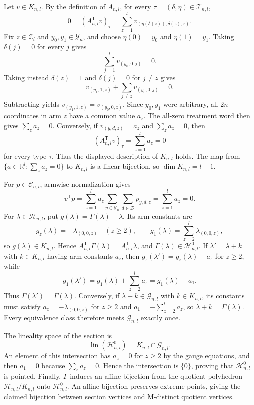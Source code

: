 Let \(v\in K_{n,l}\). By the definition of \(A_{n,l}\), for every \(\tau=(\delta,\eta)\in\mathcal T_{n,l}\),
\[
0=(A_{n,l}^{\mathsf T}v)_\tau=\sum_{z=1}^l v_{(\eta(\delta(z)),\delta(z),z)}.
\]
Fix \(z\in\mathcal Z_l\) and \(y_0,y_1\in\mathcal Y_n\), and choose \(\eta(0)=y_0\) and \(\eta(1)=y_1\). Taking \(\delta(j)=0\) for every \(j\) gives
\[
\sum_{j=1}^l v_{(y_0,0,j)}=0.
\]
Taking instead \(\delta(z)=1\) and \(\delta(j)=0\) for \(j\ne z\) gives
\[
v_{(y_1,1,z)}+\sum_{j\ne z}v_{(y_0,0,j)}=0.
\]
Subtracting yields \(v_{(y_1,1,z)}=v_{(y_0,0,z)}\). Since \(y_0,y_1\) were arbitrary, all \(2n\) coordinates in arm \(z\) have a common value \(a_z\). The all-zero treatment word then gives \(\sum_z a_z=0\). Conversely, if \(v_{(y,d,z)}=a_z\) and \(\sum_z a_z=0\), then
\[
(A_{n,l}^{\mathsf T}v)_\tau=\sum_{z=1}^l a_z=0
\]
for every type \(\tau\). Thus the displayed description of \(K_{n,l}\) holds. The map from \(\{a\in\mathbb R^l:\sum_z a_z=0\}\) to \(K_{n,l}\) is a linear bijection, so \(\dim K_{n,l}=l-1\).

For \(p\in\mathcal C_{n,l}\), armwise normalization gives
\[
v^{\mathsf T}p=\sum_{z=1}^l a_z\sum_{y\in\mathcal Y_n}\sum_{d\in\mathcal D}p_{y,d,z}=\sum_{z=1}^l a_z=0.
\]
For \(\lambda\in\mathcal H_{n,l}\), put \(g(\lambda)=\Gamma(\lambda)-\lambda\). Its arm constants are
\[
g_z(\lambda)=-\lambda_{(0,0,z)}\quad(z\ge2),\qquad g_1(\lambda)=\sum_{z=2}^l\lambda_{(0,0,z)},
\]
so \(g(\lambda)\in K_{n,l}\). Hence \(A_{n,l}^{\mathsf T}\Gamma(\lambda)=A_{n,l}^{\mathsf T}\lambda\), and \(\Gamma(\lambda)\in\mathcal H^0_{n,l}\). If \(\lambda'=\lambda+k\) with \(k\in K_{n,l}\) having arm constants \(a_z\), then \(g_z(\lambda')=g_z(\lambda)-a_z\) for \(z\ge2\), while
\[
g_1(\lambda')=g_1(\lambda)+\sum_{z=2}^l a_z=g_1(\lambda)-a_1.
\]
Thus \(\Gamma(\lambda')=\Gamma(\lambda)\). Conversely, if \(\lambda+k\in\mathcal G_{n,l}\) with \(k\in K_{n,l}\), its constants must satisfy \(a_z=-\lambda_{(0,0,z)}\) for \(z\ge2\) and \(a_1=-\sum_{z=2}^l a_z\), so \(\lambda+k=\Gamma(\lambda)\). Every equivalence class therefore meets \(\mathcal G_{n,l}\) exactly once.

The lineality space of the section is
\[
\operatorname{lin}(\mathcal H^0_{n,l})=K_{n,l}\cap\mathcal G_{n,l}.
\]
An element of this intersection has \(a_z=0\) for \(z\ge2\) by the gauge equations, and then \(a_1=0\) because \(\sum_z a_z=0\). Hence the intersection is \(\{0\}\), proving that \(\mathcal H^0_{n,l}\) is pointed. Finally, \(\Gamma\) induces an affine bijection from the quotient polyhedron \(\mathcal H_{n,l}/K_{n,l}\) onto \(\mathcal H^0_{n,l}\). An affine bijection preserves extreme points, giving the claimed bijection between section vertices and M-distinct quotient vertices.